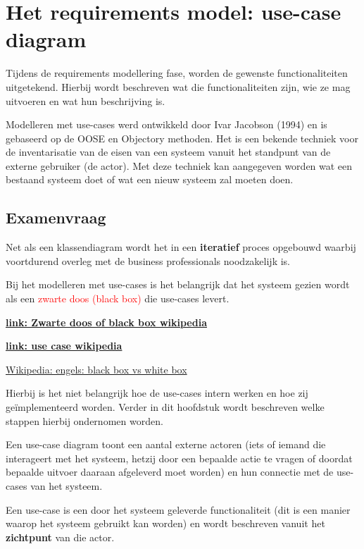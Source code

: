 \section{Het requirements model: use-case diagram}

Tijdens de requirements modellering fase, worden de gewenste functionaliteiten uitgetekend. Hierbij wordt beschreven wat die functionaliteiten zijn, wie ze mag uitvoeren en wat hun beschrijving is.

Modelleren met use-cases werd ontwikkeld door Ivar Jacobson (1994) en is gebaseerd op de OOSE en Objectory methoden. Het is een bekende techniek voor de inventarisatie van de eisen van een systeem vanuit het standpunt van de externe gebruiker (de actor). Met deze techniek kan aangegeven worden wat een bestaand systeem doet of wat een nieuw systeem zal moeten doen.

\subsection{Examenvraag}

Net als een klassendiagram wordt het in een \textbf{iteratief} proces opgebouwd waarbij voortdurend overleg met de business professionals noodzakelijk is. 

Bij het modelleren met use-cases is het belangrijk dat het systeem gezien wordt als een \textcolor{red}{zwarte doos (black box)} die use-cases levert. 

\textbf{\href{https://nl.wikipedia.org/wiki/Zwarte_doos}{link: Zwarte doos of black box wikipedia}}

\textbf{\href{https://nl.wikipedia.org/wiki/Use_case}{link: use case wikipedia}}

\href{https://en.wikipedia.org/wiki/Use_case#Design_scopes}{Wikipedia: engels: black box vs white box}



Hierbij is het niet belangrijk hoe de use-cases intern werken en hoe zij geïmplementeerd worden. Verder in dit hoofdstuk wordt beschreven welke stappen hierbij ondernomen worden.

Een use-case diagram toont een aantal externe actoren (iets of iemand die interageert met het systeem, hetzij door een bepaalde actie te vragen of doordat bepaalde uitvoer daaraan afgeleverd moet worden) en hun connectie met de use-cases van het systeem. 

Een use-case is een door het systeem geleverde functionaliteit (dit is een manier waarop het systeem gebruikt kan worden) en wordt beschreven vanuit het \textbf{zichtpunt} van die actor. 

